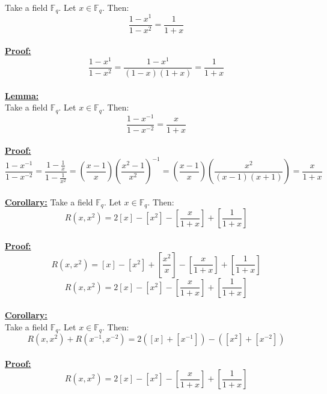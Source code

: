 \documentclass[11pt]{article}
\theoremstyle{plain}
\theoremstyle{definition}
\begin{document}
Take a field $\mathbb{F}_q$. Let $x \in \mathbb{F}_q$. Then:
\begin{equation*}
\frac{1-x^1}{1-x^2} = \frac{1}{1+x}
\end{equation*}
\\
\textbf{\underline{Proof:}}\\
\begin{equation*}
\frac{1-x^1}{1-x^2} = \frac{1-x^1}{(1-x) (1+x)} = \frac{1}{1+x}
\end{equation*}
\\
\textbf{\underline{Lemma:}}\\
Take a field $\mathbb{F}_q$. Let $x \in \mathbb{F}_q$. Then:
\begin{equation*}
\frac{1-x^{-1}}{1-x^{-2}} = \frac{x}{1+x}
\end{equation*}
\\
\textbf{\underline{Proof:}}\\
\begin{equation*}
\frac{1-x^{-1}}{1-x^{-2}} = \frac{1-\frac{1}{x}}{1-\frac{1}{x^2}} = (\frac{x-1}{x}) (\frac{x^2 - 1}{x^2})^{-1} = (\frac{x-1}{x}) (\frac{x^2}{(x -1) (x+1)}) = \frac{x}{1+x}
\end{equation*}
\\
\textbf{\underline{Corollary:}} Take a field $\mathbb{F}_q$. Let $x \in \mathbb{F}_q$. Then:
\begin{equation*}
R(x,x^2) = 2[x] - [x^2] - [\frac{x}{1+x}] + [\frac{1}{1+x}] 
\end{equation*} 
\\
\textbf{\underline{Proof:}} \\
\begin{equation*}
R(x,x^2) = [x] - [x^2] + [\frac{x^2}{x}] - [\frac{x}{1+x}] + [\frac{1}{1+x}] 
\end{equation*} 
\begin{equation*}
R(x,x^2) = 2[x] - [x^2] - [\frac{x}{1+x}] + [\frac{1}{1+x}] 
\end{equation*} 
\\
\textbf{\underline{Corollary:}} \\Take a field $\mathbb{F}_q$. Let $x \in \mathbb{F}_q$. Then:
\begin{equation*}
R(x,x^2) + R(x^{-1}, x^{-2})= 2([x] + [x^{-1}]) - ([x^2] + [x^{-2}]) 
\end{equation*} 
\\
\textbf{\underline{Proof:}} \\
\begin{equation*}
R(x,x^2) = 2[x] - [x^2] - [\frac{x}{1+x}] + [\frac{1}{1+x}] 
\end{equation*} 
\end{document}
